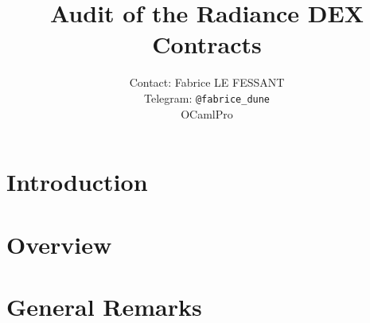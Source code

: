 \documentclass[twoside]{report}
\newif\ifsolmodules
\newif\ifsolissues
\newif\ifsoldraft
\begin{document}
\title{Audit of the Radiance DEX Contracts}
\author{Contact: Fabrice LE FESSANT\\Telegram: {\tt @fabrice\_dune}\\ OCamlPro}
\maketitle
\dominitoc
\ifsolissues
\listoffigures
\fi
\tableofcontents


\ifsoldraft
\chapter*{To edit this document}

In the report.tex file, choose:
\begin{itemize}
\item{\bf \textbackslash{}soldraftfalse} to remove draft mode (watermarks, advises)
\item{\bf \textbackslash{}solmodulestrue} to display modules by chapter instead of contracts
\item{\bf \textbackslash{}soltablestrue} to display tables for parameters and returns
\item{\bf \textbackslash{}solissuesfalse} to remove the table of issues
\end{itemize}

Issues can be entered with:
\begin{itemize}
\item{\bf \textbackslash{}issueCritical\{title\}\{text\}}
\item{\bf \textbackslash{}issueMajor\{title\}\{text\}}
\item{\bf \textbackslash{}issueMinor\{title\}\{text\}}
\end{itemize}
\fi

\chapter{Introduction}
\label{chapter:introduction}


\chapter{Overview}
\label{chapter:overview}


\chapter{General Remarks}
\label{chapter:general}




\ifsolmodules

\else

\fi
\end{document}
